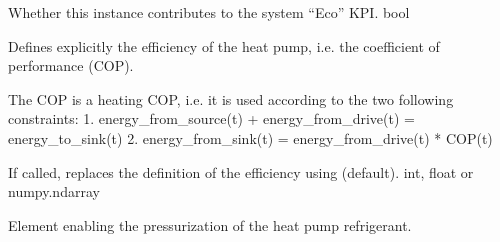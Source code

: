 \documentclass[letterpaper,10pt,english]{sphinxmanual}
\begin{document}
\begin{fulllineitems}
\begin{fulllineitems}
\end{fulllineitems}


\begin{fulllineitems}
\label{\detokenize{generated/tamos.production.CompHP:tamos.production.CompHP.eco_count}}
\pysigstartsignatures
{}
\pysigstopsignatures
\sphinxAtStartPar
Whether this instance contributes to the system “Eco” KPI.
bool

\end{fulllineitems}


\begin{fulllineitems}
\label{\detokenize{generated/tamos.production.CompHP:tamos.production.CompHP.efficiency}}
\pysigstartsignatures
{}
\pysigstopsignatures
\sphinxAtStartPar
Defines explicitly the efficiency of the heat pump, i.e. the coefficient of performance (COP).

\sphinxAtStartPar
The COP is a heating COP, i.e. it is used according to the two following constraints:
1. energy\_from\_source(t) + energy\_from\_drive(t) = energy\_to\_sink(t)
2. energy\_from\_sink(t) = energy\_from\_drive(t) * COP(t)

\sphinxAtStartPar
If called, replaces the definition of the efficiency using  (default).
int, float or numpy.ndarray

\end{fulllineitems}


\begin{fulllineitems}
\label{\detokenize{generated/tamos.production.CompHP:tamos.production.CompHP.energy_drive}}
\pysigstartsignatures
{}
\pysigstopsignatures
\sphinxAtStartPar
Element enabling the pressurization of the heat pump refrigerant.


\end{fulllineitems}
\end{fulllineitems}
\end{document}
